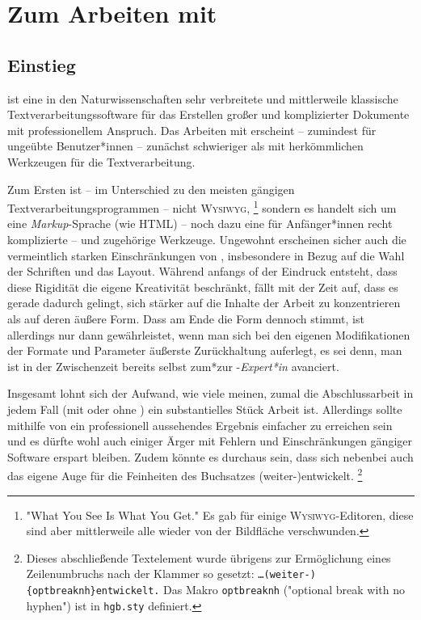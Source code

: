 \chapter{Zum Arbeiten mit \latex}
\label{cha:ArbeitenMitLatex}


\section{Einstieg}
\label{sec:LatexEinstieg}

\latex ist eine in den Naturwissenschaften sehr verbreitete und mittlerweile
klassische Textverarbeitungssoftware für das Erstellen großer und
komplizierter Dokumente mit professionellem Anspruch. Das Arbeiten mit \latex
erscheint -- zumindest für ungeübte Benutzer*innen -- zunächst schwieriger
als mit herkömmlichen Werkzeugen für die Textverarbeitung.

Zum Ersten ist -- im Unterschied zu den meisten gängigen
Text\-ver\-arbei\-tungs\-prog\-ram\-men -- \latex nicht \textsc{Wysiwyg},%
\footnote{"What You See Is What You Get." Es gab für \latex einige
\textsc{Wysiwyg}-Editoren, diese sind aber mittlerweile alle wieder von der
Bildfläche verschwunden.}
sondern es handelt sich um eine \emph{Markup}-Sprache (wie HTML) -- noch
dazu eine für Anfänger*innen recht komplizierte -- und zugehörige Werkzeuge.
Ungewohnt erscheinen sicher auch die vermeintlich starken Einschränkungen von
\latex, insbesondere in Bezug auf die Wahl der Schriften und das Layout.
Während anfangs of der Eindruck entsteht, dass diese Rigidität die eigene
Kreativität beschränkt, fällt mit der Zeit auf, dass es gerade dadurch
gelingt, sich stärker auf die Inhalte der Arbeit zu konzentrieren als auf
deren äußere Form. Dass am Ende die Form dennoch stimmt, ist allerdings nur
dann gewährleistet, wenn man sich bei den eigenen Modifikationen der Formate
und Parameter äußerste Zurückhaltung auferlegt, es sei denn, man ist in der
Zwischenzeit bereits selbst zum*zur \latex-\emph{Expert*in} avanciert.

Insgesamt lohnt sich der Aufwand, wie viele meinen, zumal die Abschlussarbeit
in jedem Fall (mit oder ohne \latex) ein substantielles Stück Arbeit ist.
Allerdings sollte mithilfe von \latex ein professionell aussehendes Ergebnis
einfacher zu erreichen sein und es dürfte wohl auch einiger Ärger mit Fehlern
und Einschränkungen gängiger Software erspart bleiben. Zudem könnte es
durchaus sein, dass sich nebenbei auch das eigene Auge für die Feinheiten des
Buchsatzes (weiter-){\obnh}entwickelt.%
\footnote{Dieses abschließende Textelement wurde übrigens zur Ermöglichung
eines Zeilenumbruchs nach der Klammer so gesetzt:
\texttt{\ldots (weiter-)\{{\bs}optbreaknh\}entwickelt.} Das Makro
\texttt{{\bs}optbreaknh} ("optional break with no hyphen") ist in
\texttt{hgb.sty} definiert.}

